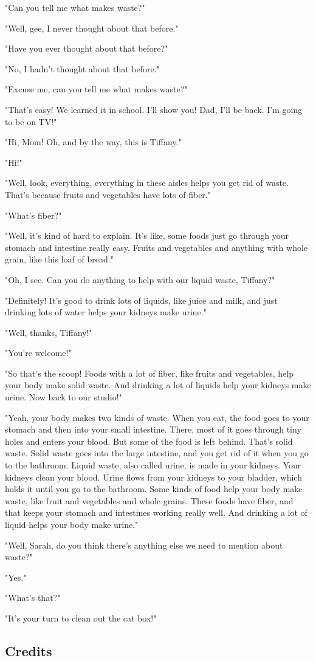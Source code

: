 "Can you tell me what makes waste?"

"Well, gee, I never thought about that before."

"Have you ever thought about that before?"

"No, I hadn't thought about that before."

"Excuse me, can you tell me what makes waste?"

"That's easy! We learned it in school. I'll show you! Dad, I'll be back. I'm going to be on TV!"

"Hi, Mom! Oh, and by the way, this is Tiffany."

"Hi!"

"Well, look, everything, everything in these aisles helps you get rid of waste. That's because fruits and vegetables have lots of fiber."

"What's fiber?"

"Well, it's kind of hard to explain. It's like, some foods just go through your stomach and intestine really easy. Fruits and vegetables and anything with whole grain, like this loaf of bread."

"Oh, I see. Can you do anything to help with our liquid waste, Tiffany?"

"Definitely! It's good to drink lots of liquids, like juice and milk, and just drinking lots of water helps your kidneys make urine."

"Well, thanks, Tiffany!"

"You're welcome!"

"So that's the scoop! Foods with a lot of fiber, like fruits and vegetables, help your body make solid waste. And drinking a lot of liquids help your kidneys make urine. Now back to our studio!"

"Yeah, your body makes two kinds of waste. When you eat, the food goes to your stomach and then into your small intestine. There, most of it goes through tiny holes and enters your blood. But some of the food is left behind. That's solid waste. Solid waste goes into the large intestine, and you get rid of it when you go to the bathroom. Liquid waste, also called urine, is made in your kidneys. Your kidneys clean your blood. Urine flows from your kidneys to your bladder, which holds it until you go to the bathroom. Some kinds of food help your body make waste, like fruit and vegetables and whole grains. These foods have fiber, and that keeps your stomach and intestines working really well. And drinking a lot of liquid helps your body make urine."

"Well, Sarah, do you think there's anything else we need to mention about waste?"

"Yes."

"What's that?"

"It's your turn to clean out the cat box!"

\subsection{Credits}